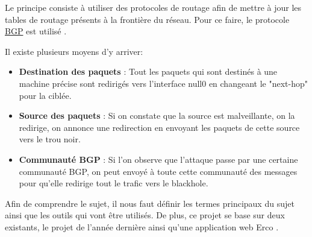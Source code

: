 Le principe consiste à utiliser des protocoles de routage afin de mettre à jour les tables de routage présents à la frontière du réseau. Pour ce faire, le protocole \hyperref[sec:BGP]{BGP} est utilisé \cite{Rfcbgp06}.

Il existe plusieurs moyens d'y arriver:

\begin{itemize}
    \item \textbf{Destination des paquets} : Tout les paquets qui sont destinés à une machine précise sont redirigés vers l'interface null0 en changeant le "next-hop" pour la ciblée.

    \item \textbf{Source des paquets} : Si on constate que la source est malveillante, on la redirige, on annonce une redirection en envoyant les paquets de cette source vers le trou noir.

    \item \textbf{Communauté BGP} : Si l'on observe que l'attaque passe par une certaine communauté BGP, on peut envoyé à toute cette communauté des messages pour qu'elle redirige tout le trafic vers le blackhole.
\end{itemize}

Afin de comprendre le sujet, il nous faut définir les termes principaux du sujet ainsi que les outils qui vont être utilisés. De plus, ce projet se base sur deux existants, le projet de l'année dernière \cite{PMCB18} ainsi qu'une application web Erco \cite{Erc16}.
